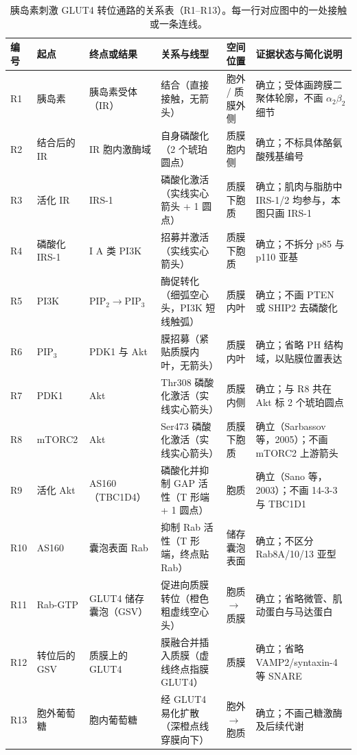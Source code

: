 \begin{table}[htbp]\centering\scriptsize
\setlength{\tabcolsep}{3pt}
\renewcommand{\arraystretch}{1.05}
\caption{胰岛素刺激 GLUT4 转位通路的关系表（R1–R13）。每一行对应图中的一处接触或一条连线。}\label{tab:ch07-01}
\begin{tabularx}{\linewidth}{lYYYYY}
\toprule
\textbf{编号} & \textbf{起点} & \textbf{终点或结果} & \textbf{关系与线型} & \textbf{空间位置} & \textbf{证据状态与简化说明} \\
\midrule
R1 & 胰岛素 & 胰岛素受体（IR） & 结合（直接接触，无箭头） & 胞外 / 质膜外侧 & 确立；受体画跨膜二聚体轮廓，不画 $\alpha_2\beta_2$ 细节 \\
R2 & 结合后的 IR & IR 胞内激酶域 & 自身磷酸化（2 个琥珀圆点） & 质膜胞内侧 & 确立；不标具体酪氨酸残基编号 \\
R3 & 活化 IR & IRS-1 & 磷酸化激活（实线实心箭头 + 1 圆点） & 质膜下胞质 & 确立；肌肉与脂肪中 IRS-1/2 均参与，本图只画 IRS-1 \\
R4 & 磷酸化 IRS-1 & I A 类 PI3K & 招募并激活（实线实心箭头） & 质膜下胞质 & 确立；不拆分 p85 与 p110 亚基 \\
R5 & PI3K & $\text{PIP}_2 \rightarrow \text{PIP}_3$ & 酶促转化（细弧空心头，PI3K 短线触弧） & 质膜内叶 & 确立；不画 PTEN 或 SHIP2 去磷酸化 \\
R6 & $\text{PIP}_3$ & PDK1 与 Akt & 膜招募（紧贴质膜内叶，无箭头） & 质膜内叶 & 确立；省略 PH 结构域，以贴膜位置表达 \\
R7 & PDK1 & Akt & Thr308 磷酸化激活（实线实心箭头） & 质膜内侧 & 确立；与 R8 共在 Akt 标 2 个琥珀圆点 \\
R8 & mTORC2 & Akt & Ser473 磷酸化激活（实线实心箭头） & 质膜下胞质 & 确立（Sarbassov 等，2005）；不画 mTORC2 上游箭头 \\
R9 & 活化 Akt & AS160（TBC1D4） & 磷酸化并抑制 GAP 活性（T 形端 + 1 圆点） & 胞质 & 确立（Sano 等，2003）；不画 14-3-3 与 TBC1D1 \\
R10 & AS160 & 囊泡表面 Rab & 抑制 Rab 活性（T 形端，终点贴 Rab） & 储存囊泡表面 & 确立；不区分 Rab8A/10/13 亚型 \\
R11 & Rab-GTP & GLUT4 储存囊泡（GSV） & 促进向质膜转位（橙色粗虚线空心头） & 胞质 $\rightarrow$ 质膜 & 确立；省略微管、肌动蛋白与马达蛋白 \\
R12 & 转位后的 GSV & 质膜上的 GLUT4 & 膜融合并插入质膜（虚线终点指膜 GLUT4） & 质膜 & 确立；省略 VAMP2/syntaxin-4 等 SNARE \\
R13 & 胞外葡萄糖 & 胞内葡萄糖 & 经 GLUT4 易化扩散（深橙点线穿膜向下） & 胞外 $\rightarrow$ 胞质 & 确立；不画己糖激酶及后续代谢 \\
\bottomrule
\end{tabularx}
\end{table}

